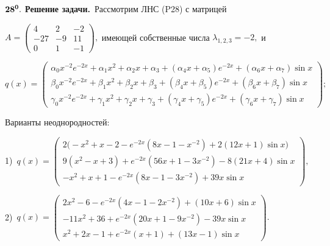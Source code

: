 \documentclass[11pt]{article}
\begin{document}
\medskip
${\bf 28^0.}$ 
{\bf Решение задачи.}\, Рассмотрим ЛНС (P28) с матрицей 

\smallskip %
$A=\begin{pmatrix} 4&2&-2\\ -27&-9&11\\ 0&1&-1 \end{pmatrix},$ имеющей собственные числа $\lambda_{1,2,3}=-2,$ и %

\smallskip %
$q(x) =  \begin{pmatrix}
\alpha_0 x^{-2}e^{-2x} + \alpha_1 x^2 + \alpha_2 x + \alpha_3 + (\alpha_4 x + \alpha_5)e^{-2x} + (\alpha_6 x + \alpha_7) \sin x \\
\beta_0  x^{-2}e^{-2x} + \beta_1 x^2 + \beta_2 x  + \beta_3 +   (\beta_4 x + \beta_5)e^{-2x}   + (\beta_6 x + \beta_7) \sin x   \\
\gamma_0 x^{-2}e^{-2x} + \gamma_1 x^2 + \gamma_2 x + \gamma_3 + (\gamma_4 x + \gamma_5)e^{-2x} + (\gamma_6 x + \gamma_7) \sin x 
\end{pmatrix};$ 

\smallskip %
Варианты неоднородностей:

1)\ $q(x) = \begin{pmatrix}
2\big(-x^{2} +x - 2 - e^{-2x}(8x - 1 - x^{-2}) + 2(12x+1)\sin x\big) \\
9(x^2 - x + 3) + e^{-2x}(56x + 1 - 3x^{-2}) - 8(21x+4)\sin x \\
-x^2 + x + 1 - e^{-2x}(8x - 1 - 3x^{-2}) + 39x\sin x
\end{pmatrix}, $ 

2)\ $q(x) = \begin{pmatrix}
2x^{2} - 6 - e^{-2x}(4x - 1 - 2x^{-2}) + (10x+6)\sin x \\
-11x^2 + 36 + e^{-2x}(20x + 1 - 9x^{-2}) - 39x \sin x\\
x^2 + 2x - 1 + e^{-2x}(x+1) + (13 x - 1) \sin x
\end{pmatrix}.$
\end{document}
